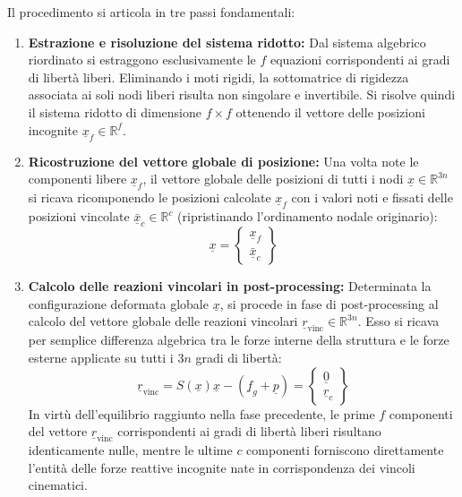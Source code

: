 Il procedimento si articola in tre passi fondamentali:

\begin{enumerate}
   \item \textbf{Estrazione e risoluzione del sistema ridotto:} 
   Dal sistema algebrico riordinato si estraggono esclusivamente le $f$ equazioni corrispondenti ai gradi di libertà liberi. Eliminando i moti rigidi, la sottomatrice di rigidezza associata ai soli nodi liberi risulta non singolare e invertibile. Si risolve quindi il sistema ridotto di dimensione $f \times f$ ottenendo il vettore delle posizioni incognite $\underline{x}_f \in \mathbb{R}^f$.

   \item \textbf{Ricostruzione del vettore globale di posizione:} 
   Una volta note le componenti libere $\underline{x}_f$, il vettore globale delle posizioni di tutti i nodi $\underline{x} \in \mathbb{R}^{3n}$ si ricava ricomponendo le posizioni calcolate $\underline{x}_f$ con i valori noti e fissati delle posizioni vincolate $\underline{\bar{x}}_c \in \mathbb{R}^c$ (ripristinando l'ordinamento nodale originario):
   \begin{equation}
      \underline{x} = \begin{Bmatrix} \underline{x}_f \\ \underline{\bar{x}}_c \end{Bmatrix}
      \label{eq:vettore_x_partizionato}
   \end{equation}

   \item \textbf{Calcolo delle reazioni vincolari in post-processing:} 
   Determinata la configurazione deformata globale $\underline{x}$, si procede in fase di post-processing al calcolo del vettore globale delle reazioni vincolari $\underline{r}_{\text{vinc}} \in \mathbb{R}^{3n}$. Esso si ricava per semplice differenza algebrica tra le forze interne della struttura e le forze esterne applicate su tutti i $3n$ gradi di libertà:
   \begin{equation}
      \underline{r}_{\text{vinc}} = S(\underline{x})\underline{x} - (\underline{f}_g + \underline{p}) = \begin{Bmatrix} \underline{0} \\ \underline{r}_c \end{Bmatrix}
      \label{eq:reazioni_post_processing}
   \end{equation}
   In virtù dell'equilibrio raggiunto nella fase precedente, le prime $f$ componenti del vettore $\underline{r}_{\text{vinc}}$ corrispondenti ai gradi di libertà liberi risultano identicamente nulle, mentre le ultime $c$ componenti forniscono direttamente l'entità delle forze reattive incognite nate in corrispondenza dei vincoli cinematici.
\end{enumerate}

